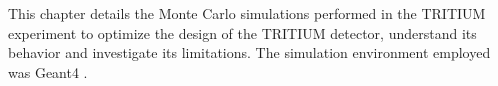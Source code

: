 This chapter details the Monte Carlo simulations performed in the TRITIUM experiment to optimize the design of the TRITIUM detector, understand its behavior and investigate its limitations. The simulation environment employed was Geant4 \cite{Geant4WebPage, Geant4P}.